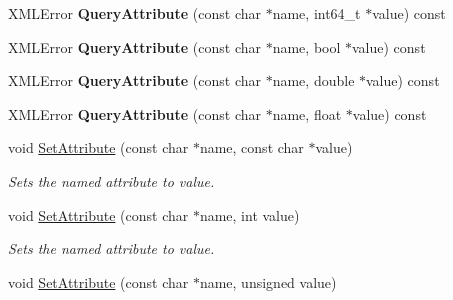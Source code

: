 \begin{DoxyCompactItemize}
\item 
X\+M\+L\+Error {\bfseries Query\+Attribute} (const char $\ast$name, int64\+\_\+t $\ast$value) const \hypertarget{classtinyxml2_1_1XMLElement_a0f7f8692259367f2ec46ee24005d63cf}{}\label{classtinyxml2_1_1XMLElement_a0f7f8692259367f2ec46ee24005d63cf}

\item 
X\+M\+L\+Error {\bfseries Query\+Attribute} (const char $\ast$name, bool $\ast$value) const \hypertarget{classtinyxml2_1_1XMLElement_a5d2ac2ec1c3593cf59345d99959f2b98}{}\label{classtinyxml2_1_1XMLElement_a5d2ac2ec1c3593cf59345d99959f2b98}

\item 
X\+M\+L\+Error {\bfseries Query\+Attribute} (const char $\ast$name, double $\ast$value) const \hypertarget{classtinyxml2_1_1XMLElement_a3ccdbfc0196a008aa53d8ddbb46f34e9}{}\label{classtinyxml2_1_1XMLElement_a3ccdbfc0196a008aa53d8ddbb46f34e9}

\item 
X\+M\+L\+Error {\bfseries Query\+Attribute} (const char $\ast$name, float $\ast$value) const \hypertarget{classtinyxml2_1_1XMLElement_a105469b77b65b1ca70702426bf714678}{}\label{classtinyxml2_1_1XMLElement_a105469b77b65b1ca70702426bf714678}

\item 
void \hyperlink{classtinyxml2_1_1XMLElement_a11943abf2d0831548c3790dd5d9f119c}{Set\+Attribute} (const char $\ast$name, const char $\ast$value)\hypertarget{classtinyxml2_1_1XMLElement_a11943abf2d0831548c3790dd5d9f119c}{}\label{classtinyxml2_1_1XMLElement_a11943abf2d0831548c3790dd5d9f119c}

\begin{DoxyCompactList}\small\item\em Sets the named attribute to value. \end{DoxyCompactList}\item 
void \hyperlink{classtinyxml2_1_1XMLElement_aae6568c64c7f1cc88be8461ba41a79cf}{Set\+Attribute} (const char $\ast$name, int value)\hypertarget{classtinyxml2_1_1XMLElement_aae6568c64c7f1cc88be8461ba41a79cf}{}\label{classtinyxml2_1_1XMLElement_aae6568c64c7f1cc88be8461ba41a79cf}

\begin{DoxyCompactList}\small\item\em Sets the named attribute to value. \end{DoxyCompactList}\item 
void \hyperlink{classtinyxml2_1_1XMLElement_ae143997e90064ba82326b29a9930ea8f}{Set\+Attribute} (const char $\ast$name, unsigned value)\hypertarget{classtinyxml2_1_1XMLElement_ae143997e90064ba82326b29a9930ea8f}{}\label{classtinyxml2_1_1XMLElement_ae143997e90064ba82326b29a9930ea8f}


\end{DoxyCompactItemize}
